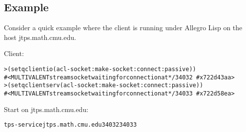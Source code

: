 \subsection{Example}

Consider a quick example where the client is running under Allegro Lisp
on the host jtps.math.cmu.edu.

Client:
\begin{alltt}
>(setq clientio (acl-socket:make-socket :connect :passive))
\#<MULTIVALENT stream socket waiting for connection at */34032 \ \#x722d43aa>
>(setq clientserv (acl-socket:make-socket :connect :passive))
\#<MULTIVALENT stream socket waiting for connection at */34033 \ \#x722d58ea>
\end{alltt}

Start {\TPS} on jtps.math.cmu.edu:
\begin{alltt}
tps -service jtps.math.cmu.edu 34032 34033
\end{alltt}


